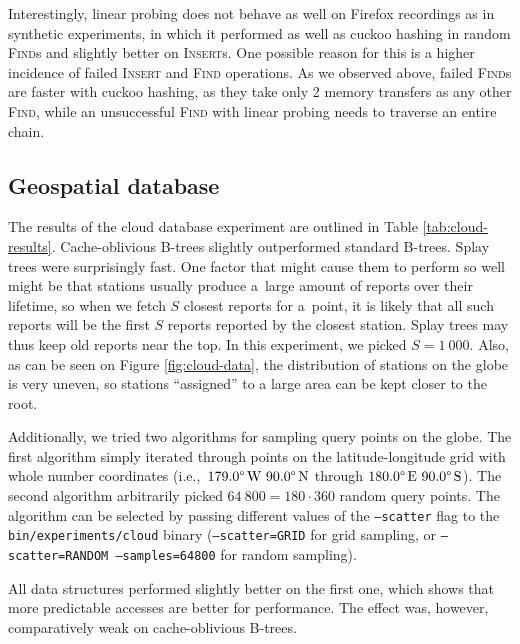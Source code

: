 Interestingly, linear probing does not behave as well on Firefox recordings
as in synthetic experiments, in which it performed as well as cuckoo hashing
in random \textsc{Find}s and slightly better on \textsc{Insert}s. One possible
reason for this is a higher incidence of failed \textsc{Insert} and
\textsc{Find} operations. As we observed above, failed \textsc{Find}s are
faster with cuckoo hashing, as they take only 2 memory transfers as any other
\textsc{Find}, while an unsuccessful \textsc{Find} with linear probing needs to
traverse an entire chain.

\subsection{Geospatial database}
The results of the cloud database experiment are outlined in Table
\ref{tab:cloud-results}. Cache-oblivious \mbox{B-trees} slightly outperformed
standard \mbox{B-trees}. Splay trees were surprisingly fast. One factor that
might cause them to perform so well might be that stations usually produce
a~large amount of reports over their lifetime, so when we fetch $S$ closest
reports for a~point, it is likely that all such reports will be the first $S$
reports reported by the closest station. Splay trees may thus keep old reports
near the top. In this experiment, we picked $S=1~000$. Also, as can be
seen on Figure \ref{fig:cloud-data}, the distribution of stations on the globe
is very uneven, so stations ``assigned'' to a large area can be kept closer to
the root.

Additionally, we tried two algorithms for sampling query points on the globe.
The first algorithm simply iterated through points on the latitude-longitude
grid with whole number coordinates (i.e.,\
$179.0\degree\,\text{W}\ 90.0\degree\,\text{N}$ through
$180.0\degree\,\text{E}\ 90.0\degree\,\text{S}$).
The second algorithm arbitrarily picked $64~800=180\cdot 360$ random query
points.
The algorithm can be selected by passing different values of the
\texttt{--scatter} flag to the \texttt{bin/experiments/cloud} binary
(\texttt{--scatter=GRID} for grid sampling, or \texttt{--scatter=RANDOM
--samples=64800} for random sampling).

All data structures performed slightly better on the first one, which shows
that more predictable accesses are better for performance. The effect was,
however, comparatively weak on cache-oblivious B-trees.

